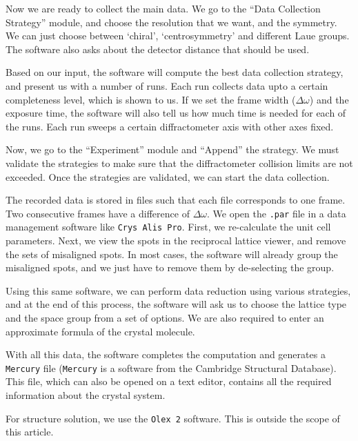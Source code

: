 Now we are ready to collect the main data. We go to the ``Data Collection Strategy'' module, and choose the resolution that we want, and the symmetry. We can just choose between `chiral',  `centrosymmetry' and different Laue groups. The software also asks about the detector distance that should be used.

Based on our input, the software will compute the best data collection strategy, and present us with a number of runs. Each run collects data upto a certain completeness level, which is shown to us. If we set the frame width ($\Delta \omega$) and the exposure time, the software will also tell us how much time is needed for each of the runs. Each run sweeps a certain diffractometer axis with other axes fixed.

Now, we go to the ``Experiment'' module and ``Append'' the strategy. We must validate the strategies to make sure that the diffractometer collision limits are not exceeded. Once the strategies are validated, we can start the data collection.

The recorded data is stored in files such that each file corresponds to one frame. Two consecutive frames have a difference of $\Delta \omega.$ We open the \texttt{.par} file in a data management software like \texttt{Crys Alis Pro}. First, we re-calculate the unit cell parameters. Next, we view the spots in the reciprocal lattice viewer, and remove the sets of misaligned spots. In most cases, the software will already group the misaligned spots, and we just have to remove them by de-selecting the group.

Using this same software, we can perform data reduction using various strategies, and at the end of this process, the software will ask us to choose the lattice type and the space group from a set of options. We are also required to enter an approximate formula of the crystal molecule.

With all this data, the software completes the computation and generates a \texttt{Mercury} file (\texttt{Mercury} is a software from the Cambridge Structural Database). This file, which can also be opened on a text editor, contains all the required information about the crystal system.

For structure solution, we use the \texttt{Olex 2} software. This is outside the scope of this article.
